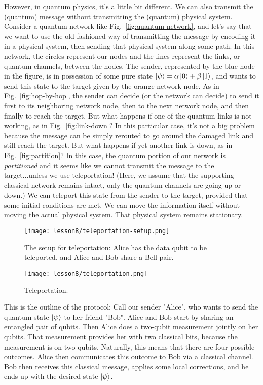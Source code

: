 However, in quantum physics, it's a little bit different. We can also transmit the (quantum) message without transmitting the (quantum) physical system. Consider a quantum network like Fig.~\ref{fig:quantum-network}, and let's say that we want to use the old-fashioned way of transmitting the message by encoding it in a physical system, then sending that physical system along some path. In this network, the circles represent our nodes and the lines represent the links, or quantum channels, between the nodes. The sender, represented by the blue node in the figure, is in possession of some pure state $\left| \psi \right\rangle = \alpha\left| 0 \right\rangle+\beta\left| 1 \right\rangle$, and  wants to send this state to the target given by the orange network node. As in Fig.~\ref{fig:hop-by-hop}, the sender can decide (or the network can decide) to send it first to its neighboring network node, then to the next network node, and then finally to reach the target. But what happens if one of the quantum links is not working, as in Fig.~\ref{fig:link-down}? In this particular case, it's not a big problem because the message can be simply rerouted to go around the damaged link and still reach the target. But what happens if yet another link is down, as in Fig.~\ref{fig:partition}? In this case, the quantum portion of our network is \emph{partitioned} and it seems like we cannot transmit the message to the target...unless we use teleportation! (Here, we assume that the supporting classical network remains intact, only the quantum channels are going up or down.) We can teleport this state from the sender to the target, provided that some initial conditions are met. We can move the information itself without moving the actual physical system. That physical system remains stationary.

\begin{figure}[H]
    \centering
    \texttt{[image: lesson8/teleportation-setup.png]}
        \caption[The setup for teleportation.]{The setup for teleportation: Alice has the data qubit to be teleported, and Alice and Bob share a Bell pair.}
    \label{fig:teleportation-setup}
\end{figure}

\begin{figure}[H]
    \centering
    \texttt{[image: lesson8/teleportation.png]}
        \caption{Teleportation.}
    \label{fig:teleportation}
\end{figure}

This is the outline of the protocol: Call our sender "Alice", who wants to send the quantum state $\left| \psi \right\rangle$ to her friend "Bob".  Alice and Bob start by sharing an entangled pair of qubits. Then Alice does a two-qubit measurement jointly on her qubits. That measurement provides her with two classical bits, because the measurement is on two qubits.  Naturally, this means that there are four possible outcomes. Alice then communicates this outcome to Bob via a classical channel.  Bob then receives this classical message, applies some local corrections, and he ends up with the desired state $\left| \psi \right\rangle$. 

